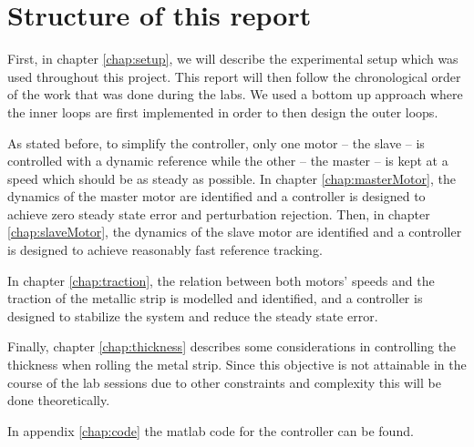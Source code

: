 \section{Structure of this report}
First, in chapter \ref{chap:setup}, we will describe the experimental setup which was used throughout this project. This report will then follow the chronological order of the work that was done during the labs. We used a bottom up approach where the inner loops are first implemented in order to then design the outer loops.

As stated before, to simplify the controller, only one motor -- the slave -- is controlled with a dynamic reference while the other -- the master -- is kept at a speed which should be as steady as possible. In chapter \ref{chap:masterMotor}, the dynamics of the master motor are identified and a controller is designed to achieve zero steady state error and perturbation rejection. Then, in chapter \ref{chap:slaveMotor}, the dynamics of the slave motor are identified and a controller is designed to achieve reasonably fast reference tracking.

In chapter \ref{chap:traction}, the relation between both motors' speeds and the traction of the metallic strip is modelled and identified, and a controller is designed to stabilize the system and reduce the steady state error.

Finally, chapter \ref{chap:thickness} describes some considerations in controlling the thickness when rolling the metal strip. Since this objective is not attainable in the course of the lab sessions due to other constraints and complexity this will be done theoretically.

In appendix \ref{chap:code} the matlab code for the controller can be found.
